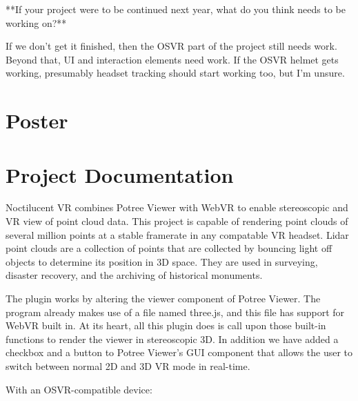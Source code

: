 \documentclass[draftclsnofoot,onecolumn]{IEEEtran}
\begin{document}
**If your project were to be continued next year, what do you think needs to be working on?**

If we don't get it finished, then the OSVR part of the project still needs work. Beyond that, UI and interaction elements need work. If the OSVR helmet gets working, presumably headset tracking should start working too, but I'm unsure. 

\section{Poster}

\section{Project Documentation}

Noctilucent VR combines Potree Viewer with WebVR to enable stereoscopic and VR view of point cloud data. 
This project is capable of rendering point clouds of several million points at a stable framerate in any compatable VR headset. 
Lidar point clouds are a collection of points that are collected by bouncing light off objects to determine its position in 3D space. 
They are used in surveying, disaster recovery, and the archiving of historical monuments.

The plugin works by altering the viewer component of Potree Viewer. 
The program already makes use of a file named three.js, and this file has support for WebVR built in. 
At its heart, all this plugin does is call upon those built-in functions to render the viewer in stereoscopic 3D. 
In addition we have added a checkbox and a button to Potree Viewer's GUI component that allows the user to switch between normal 2D and 3D VR mode in real-time.

With an OSVR-compatible device:
\end{document}

